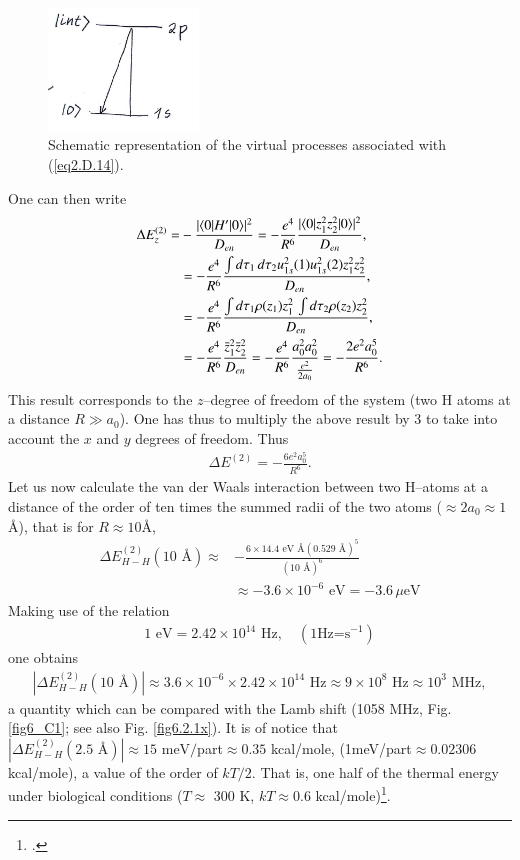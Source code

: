 \begin{subappendices}
        \begin{figure}[h]
         \centerline{\includegraphics*[width=4cm,angle=0]{nutshell/figs/fig2D5.pdf}}
         \caption{Schematic representation of the virtual processes associated with (\ref{eq2.D.14}).}\label{fig2.D.5}
         \end{figure}
  One can then write
  \begin{align}\label{eq2.D.17}
  \nonumber \Delta E_z^{(2)}=&-\frac{|\langle {0|H'|0} \rangle|^2}{D_{en}}=-\frac{e^4}{R^6}\frac{|\langle {0|z_1^2z_2^2|0} \rangle|^2}{D_{en}},\\
\nonumber  &=-\frac{e^4}{R^6}\frac{\int d\tau_1\,d\tau_2u^2_{1s}(1)u^2_{1s}(2)z_1^2z_2^2}{D_{en}},\\
\nonumber  &=-\frac{e^4}{R^6}\frac{\int d\tau_1\rho(z_1)z_1^2\,\int d\tau_2\rho(z_2)z_2^2}{D_{en}},\\
&=-\frac{e^4}{R^6}\frac{\bar z_1^2 \bar z_2^2}{D_{en}}=-\frac{e^4}{R^6}\frac{a_0^2a_0^2}{\frac{e^2}{2a_0}}=-\frac{2e^2a_0^5}{R^6}.  
   \end{align} 
This result corresponds to the $z$--degree of freedom of the system (two H atoms at a distance $R\gg a_0$). One has thus to multiply the above result by 3 to take into account the $x$ and $y$ degrees of freedom. Thus   
   \begin{align}\label{eq2.D.18}
\Delta E^{(2)}=-\frac{6e^2a_0^5}{R^6}.
 \end{align}
Let us now calculate the van der Waals interaction between two H--atoms at a distance of the order of ten times the summed radii of the two atoms ($\approx2a_0\approx1$\AA), that is for $R\approx10$\AA, 
  \begin{align}\label{eq2.D.19}
  \nonumber \Delta E_{H-H}^{(2)}(10\text{ \AA})\approx&-\frac{6\times14.4\text{ eV \AA}(0.529\text{ \AA})^5}{(10\text{ \AA})^6}\\
  &\approx-3.6\times10^{-6}\text{ eV}=-3.6\,\mu\text{eV}  
   \end{align}  
Making use of the relation
\begin{align}\label{eq2.D.20}
1\text{ eV}=2.42\times 10^{14}\text{ Hz},\quad(1\text{Hz=s}^{-1})  
   \end{align}  
 one obtains
\begin{align}\label{eq2.D.21}
|\Delta E_{H-H}^{(2)}(10\text{ \AA})|\approx3.6\times 10^{-6}\times 2.42\times 10^{14}\text{ Hz}\approx9\times10^8\text{ Hz}\approx10^3\text{ MHz},      
\end{align} 
 a quantity which can be compared with the Lamb shift (1058 MHz, Fig. \ref{fig6_C1}; see also Fig. \ref{fig6.2.1x}). It is of notice that $|\Delta E_{H-H}^{(2)}(2.5\text{ \AA})|\approx15\text{ meV}/$part$\approx0.35$ kcal/mole, (1meV/part$\approx0.02306$ kcal/mole), a value of the order of $kT/2$. That is, one half of the thermal energy under biological conditions ($T\approx$ 300 K, $kT\approx 0.6$ kcal/mole)\footnote{\cite{Huang:05}.}.

\end{subappendices}
